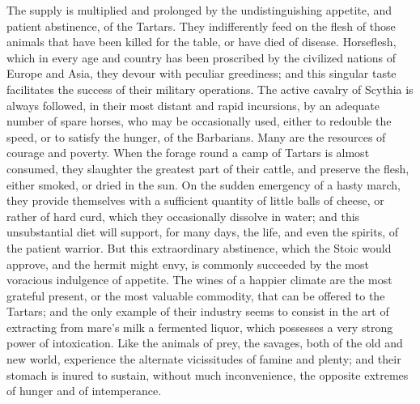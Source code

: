 The supply is multiplied and prolonged by the undistinguishing
appetite, and patient abstinence, of the Tartars. They
indifferently feed on the flesh of those animals that have been
killed for the table, or have died of disease. Horseflesh, which
in every age and country has been proscribed by the civilized
nations of Europe and Asia, they devour with peculiar greediness;
and this singular taste facilitates the success of their military
operations. The active cavalry of Scythia is always followed, in
their most distant and rapid incursions, by an adequate number of
spare horses, who may be occasionally used, either to redouble
the speed, or to satisfy the hunger, of the Barbarians. Many are
the resources of courage and poverty. When the forage round a
camp of Tartars is almost consumed, they slaughter the greatest
part of their cattle, and preserve the flesh, either smoked, or
dried in the sun. On the sudden emergency of a hasty march, they
provide themselves with a sufficient quantity of little balls of
cheese, or rather of hard curd, which they occasionally dissolve
in water; and this unsubstantial diet will support, for many
days, the life, and even the spirits, of the patient warrior. But
this extraordinary abstinence, which the Stoic would approve, and
the hermit might envy, is commonly succeeded by the most
voracious indulgence of appetite. The wines of a happier climate
are the most grateful present, or the most valuable commodity,
that can be offered to the Tartars; and the only example of their
industry seems to consist in the art of extracting from mare’s
milk a fermented liquor, which possesses a very strong power of
intoxication. Like the animals of prey, the savages, both of the
old and new world, experience the alternate vicissitudes of
famine and plenty; and their stomach is inured to sustain,
without much inconvenience, the opposite extremes of hunger and
of intemperance.


